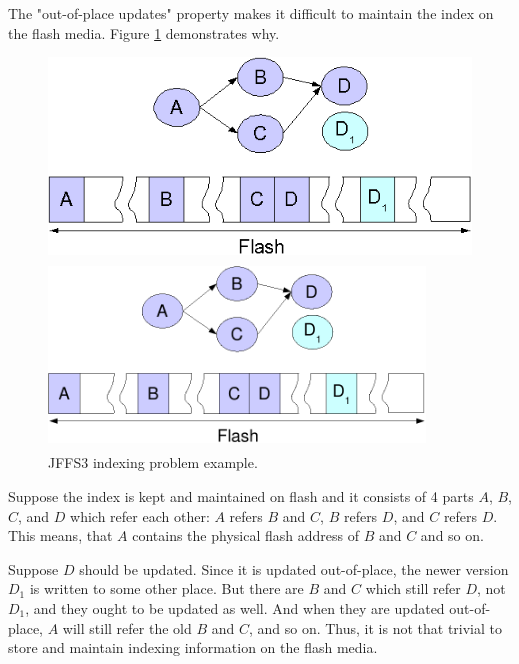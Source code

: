 \documentclass[12pt,a4paper,oneside,titlepage]{article}
\begin{document}
The "\mbox{out-of-place} updates" property makes it difficult to maintain the
index on the flash media. Figure \ref{ref_FigureIndexProblem} demonstrates why.

%
%
\begin{figure}[h]
\begin{center}
\begin{htmlonly}
\includegraphics{pics/idxprobl.png}
\end{htmlonly}
\includegraphics[width=100mm,height=50mm]{pics/idxprobl.pdf}
\end{center}
\caption{JFFS3 indexing problem example.}
\label{ref_FigureIndexProblem}
\end{figure}

Suppose the index is kept and maintained on flash and it consists of 4
parts $A$, $B$, $C$, and $D$ which refer each other: $A$ refers $B$ and $C$,
$B$ refers $D$, and $C$ refers $D$. This means, that $A$ contains the physical
flash address of $B$ and $C$ and so on.

Suppose $D$ should be updated. Since it is updated \mbox{out-of-place}, the
newer version $D_1$ is written to some other place. But there are $B$ and $C$
which still refer $D$, not $D_1$, and they ought to be updated as well. And
when they are updated \mbox{out-of-place}, $A$ will still refer the old $B$ and
$C$, and so on. Thus, it is not that trivial to store and maintain indexing
information on the flash media.
\end{document}

